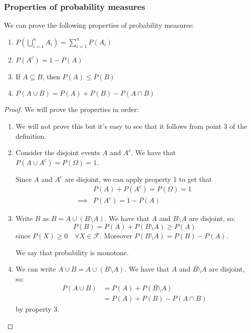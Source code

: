 \documentclass[10pt]{extarticle}
\newcommand{\F}{\mathcal{F}}
\begin{document}
\subsubsection{Properties of probability measures}

We can prove the following properties of probability measures:
\begin{enumerate}
    \item $P(\bigcup_{i=1}^n A_i) = \sum_{i=1}^n P(A_i)$
    \item $P(A^c) = 1 - P(A)$
    \item If $A \subseteq B$, then $P(A) \le P(B)$
    \item $P(A \cup B) = P(A) + P(B) - P(A \cap B)$
\end{enumerate}

\begin{proof}
    We will prove the properties in order:
    \begin{enumerate}
        \item We will not prove this but it's easy to see that it follows from point 3 of the definition.
        \item Consider the disjoint events $A$ and $A^c$.
              We have that $P(A \cup A^c) = P(\Omega) = 1$.

              Since $A$ and $A^c$ are disjoint, we can apply property 1 to get that
              \begin{align*}
                           & P(A) + P(A^c) = P(\Omega) = 1 \\
                  \implies & P(A^c) = 1 - P(A)
              \end{align*}
        \item Write $B$ as $B = A \cup (B \setminus A)$.
              We have that $A$ and $B \setminus A$ are disjoint, so:
              $$
                  P(B) = P(A) + P(B \setminus A) \ge P(A)
              $$
              since $P(X) \ge 0 \quad \forall X \in \F$.
              Moreover $P(B \setminus A) = P(B) - P(A)$.

              We say that probability is monotone.
        \item We can write $A \cup B = A \cup (B \setminus A)$.
              We have that $A$ and $B \setminus A$ are disjoint, so:
              \begin{align*}
                  P(A \cup B) & = P(A) + P(B \setminus A)   \\
                              & = P(A) + P(B) - P(A \cap B)
              \end{align*}
              by property 3.
    \end{enumerate}
\end{proof}
\end{document}
